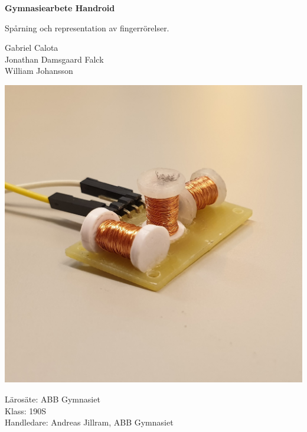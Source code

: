 \begin{titlepage}
    \centering

    \vspace*{0,5cm}

    \begin{LARGE}
        \textbf{Gymnasiearbete Handroid}
    \end{LARGE}

    \begin{Large}

        \vspace{1cm}

        Spårning och representation av fingerrörelser.

    \end{Large}

    \vspace{1cm}

    \begin{large}
        Gabriel Calota\\
        Jonathan Damsgaard Falck\\
        William Johansson
    \end{large}

    \vspace{0.5cm}
    \includegraphics[width=\textwidth]{images/Spolhubb1.jpg}
    \vfill

    \begin{large}
        Lärosäte: ABB Gymnasiet\\
        \vspace{0.5cm}
        Klass: 190S\\
        \vspace{0.5cm}
        Handledare: Andreas Jillram, ABB Gymnasiet
    \end{large}

\end{titlepage}